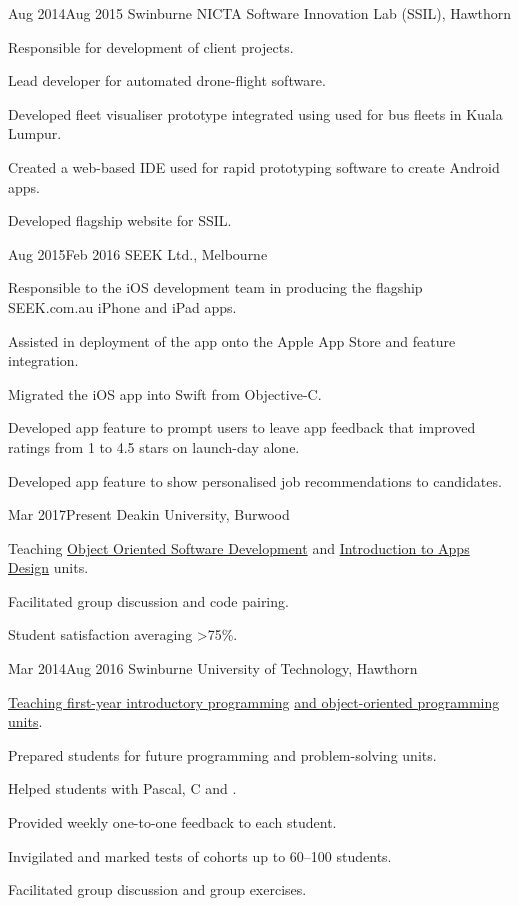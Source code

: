 {Aug 2014}{Aug 2015}
{Swinburne NICTA Software Innovation Lab (SSIL), Hawthorn}
{
  \item Responsible for development of client projects.
}
{
  \item Lead developer for automated drone-flight software.
  \item Developed fleet visualiser prototype integrated using used for bus fleets in Kuala Lumpur.
  \item Created a web-based IDE used for rapid prototyping software to create Android apps.
  \item Developed flagship website for SSIL.
}

{Aug 2015}{Feb 2016}
{SEEK Ltd., Melbourne}
{
  \item Responsible to the iOS development team in producing the flagship SEEK.com.au iPhone and iPad apps.
  \item Assisted in deployment of the app onto the Apple App Store and feature integration.
  \item Migrated the iOS app into Swift from Objective-C.
}
{
  \item Developed app feature to prompt users to leave app feedback that improved ratings from 1  to 4.5 stars on launch-day alone.
  \item Developed app feature to show personalised job recommendations to candidates.
}

\clearpage

{Mar 2017}{Present}
{Deakin University, Burwood}
{\item Teaching \href{http://www.deakin.edu.au/current-students-courses/unit.php?unit=SIT232}{Object Oriented Software Development} and \href{http://www.deakin.edu.au/current-students-courses/unit.php?unit=SIT120}{Introduction to Apps Design} units.
}
{
  \item Facilitated group discussion and code pairing.
  \item Student satisfaction averaging >75\%.
}

{Mar 2014}{Aug 2016}
{Swinburne University of Technology, Hawthorn}
{\item \href{http://www.swinburne.edu.au/study/courses/units/Introduction-to-Programming-COS10009/local}{Teaching first-year introductory programming} \href{http://www.swinburne.edu.au/study/courses/units/Object-Oriented-Programming-COS70006/local}{and object-oriented programming units}.
  \item Prepared students for future programming and problem-solving units.
  \item Helped students with Pascal, C and \Csh{}.
}
{
  \item Provided weekly one-to-one feedback to each student.
  \item Invigilated and marked tests of cohorts up to 60--100 students.
  \item Facilitated group discussion and group exercises.
}

